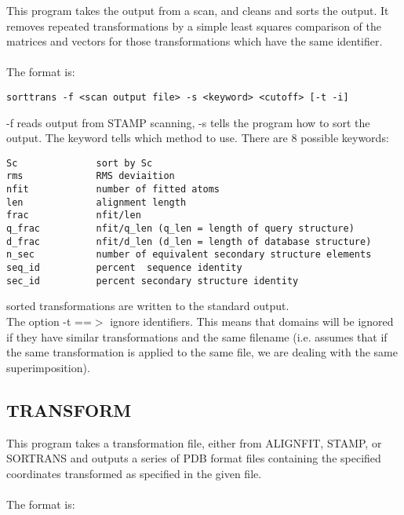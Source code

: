 This program takes the output from a scan, and cleans and sorts the
output.  It removes repeated transformations by a simple least 
squares comparison of the matrices and vectors for those 
transformations which have the same identifier.\\
\\
The format is:\\

\begin{scriptsize}\begin{verbatim}
sorttrans -f <scan output file> -s <keyword> <cutoff> [-t -i]
\end{verbatim} \end{scriptsize}

-f reads output from STAMP scanning, -s tells the program how to 
sort the output.  The keyword tells which method to use.  There
are 8 possible keywords:\\

\begin{scriptsize}\begin{verbatim}
Sc              sort by Sc
rms             RMS deviaition
nfit            number of fitted atoms
len             alignment length
frac            nfit/len
q_frac          nfit/q_len (q_len = length of query structure)
d_frac          nfit/d_len (d_len = length of database structure)
n_sec           number of equivalent secondary structure elements
seq_id          percent  sequence identity
sec_id          percent secondary structure identity
\end{verbatim} \end{scriptsize}

sorted transformations are written to the standard output.
\\
The option -t ==$>$ ignore identifiers.  This means that domains will be 
ignored if they have similar transformations and the same filename (i.e.
assumes that  if the same transformation is applied to the same
file, we are dealing with the same superimposition).

\subsection{TRANSFORM}

This program takes a transformation file, either from ALIGNFIT,
STAMP, or SORTRANS and outputs a series of PDB format files
containing the specified coordinates transformed as specified in
the given file.\\
\\
The format is:\\

